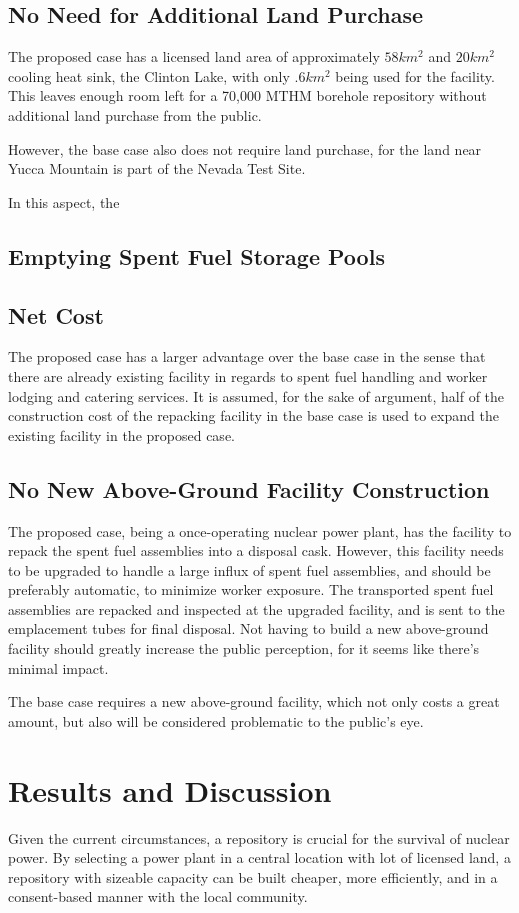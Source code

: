
\subsection{No Need for Additional Land Purchase}
The proposed case has a licensed land area of approximately $58km^2$ and $20km^2$
 cooling heat sink, the Clinton Lake, with only $.6km^2$ being used for the facility.
  \cite{NRC_Clinton} This leaves enough room left for a 70,000 \gls{MTHM} borehole
  repository without additional land purchase from the public.
  
  However, the base case also does not require land purchase, for the land near 
  Yucca Mountain is part of the Nevada Test Site. 
  
  In this aspect, the 

\subsection{Emptying Spent Fuel Storage Pools }




\subsection{Net Cost}
The proposed case has a larger advantage over the base case in the sense that there
are already existing facility in regards to spent fuel handling and worker lodging 
and catering services. 
It is assumed, for the sake of argument, half of the construction cost of the
repacking facility in the base case is used to expand the existing facility in the
proposed case. 

\subsection{No New Above-Ground Facility Construction}
The proposed case, being a once-operating nuclear power plant, has the facility to 
repack the spent fuel assemblies into a disposal cask. However, this facility needs 
to be upgraded to handle a large influx of spent fuel assemblies, and should be
preferably automatic, to minimize worker exposure. The transported spent fuel
assemblies are repacked and inspected at the upgraded facility, and is sent to the
emplacement tubes for final disposal. Not having to build a new above-ground facility
should greatly increase the public perception, for it seems like there's minimal
impact.

The base case requires a new above-ground facility, which not only costs a great
amount, but also will be considered problematic to the public's eye. 


\section{Results and Discussion}
Given the current circumstances, a repository is crucial for the survival of nuclear
power. By selecting a power plant in a central location with lot of licensed land,
a repository with sizeable capacity can be built cheaper, more efficiently, and 
in a consent-based manner with the local community. 
